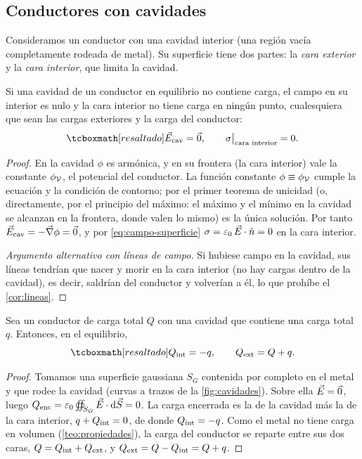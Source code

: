 \subsection{Conductores con cavidades}\label{sec:cavidades-casos}
Consideramos un conductor con una cavidad interior (una región vacía completamente rodeada de metal). Su superficie tiene dos partes: la
\emph{cara exterior} y la \emph{cara interior}, que limita la cavidad.

\begin{teorema}\label{teo:faraday}
Si una cavidad de un conductor en equilibrio no contiene carga, el campo en su interior es nulo y la cara interior no tiene carga en ningún
punto, cualesquiera que sean las cargas exteriores y la carga del conductor:
\begin{equation}\label{eq:faraday}
  \resalta{\Ecav=\vc{0},\qquad\sigma\big|_{\text{cara interior}}=0 .}
\end{equation}
\end{teorema}
\begin{proof}
En la cavidad $\phi$ es armónica, y en su frontera (la cara interior) vale la constante $\phi_{\mathcal{V}}$, el potencial del conductor. La función
constante $\phi\equiv\phi_{\mathcal{V}}$ cumple la ecuación y la condición de contorno; por el primer teorema de unicidad (o, directamente, por el principio
del máximo: el máximo y el mínimo en la cavidad se alcanzan en la frontera, donde valen lo mismo) es la única solución. Por tanto
$\vec{E}_{\mathrm{cav}}=-\vec{\nabla}\phi=\vec{0}$, y por \cref{eq:campo-superficie} $\sigma=\varepsilon_{0}\,\vec{E}\cdot\hat{n}=0$ en la cara interior.

\emph{Argumento alternativo con líneas de campo.} Si hubiese campo en la cavidad, sus líneas tendrían que nacer y morir en la cara interior
(no hay cargas dentro de la cavidad), es decir, saldrían del conductor y volverían a él, lo que prohíbe el \cref{cor:lineas}.
\end{proof}

\begin{proposicion}\label{prop:caras}
Sea un conductor de carga total $Q$ con una cavidad que contiene una carga total $q$. Entonces, en el equilibrio,
\begin{equation}\label{eq:caras}
  \resalta{\Qint=-q,\qquad\Qext=Q+q .}
\end{equation}
\end{proposicion}
\begin{proof}
Tomamos una superficie gaussiana $S_G$ contenida por completo en el metal y que rodee la cavidad (curvas a trazos de la \cref{fig:cavidades}).
Sobre ella $\vec{E}=\vec{0}$, luego $Q_{\mathrm{enc}}=\varepsilon_{0}\oiint_{S_G}\vec{E}\cdot\mathrm{d}\vec{S}=0$. La carga encerrada es la de la cavidad más la de la cara interior, $q+Q_{\mathrm{int}}=0$, de donde
$Q_{\mathrm{int}}=-q$. Como el metal no tiene carga en volumen (\cref{teo:propiedades}), la carga del conductor se reparte entre sus dos caras,
$Q=Q_{\mathrm{int}}+Q_{\mathrm{ext}}$, y $Q_{\mathrm{ext}}=Q-Q_{\mathrm{int}}=Q+q$.
\end{proof}

